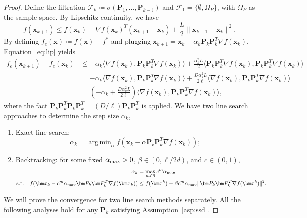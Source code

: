 \documentclass[10pt]{article} %
\numberwithin{equation}{section}
\theoremstyle{plain}
\theoremstyle{definition}
\newcommand{\<}{\langle}
\renewcommand{\>}{\rangle}
\renewcommand{\(}{\left(}
\renewcommand{\)}{\right)}
\renewcommand{\[}{\left[}
\renewcommand{\]}{\right]}
\DeclareMathOperator*{\argmin}{arg\,min}
\newcommand{\alphaMax}{\alpha_\textup{max}}
\newcommand{\Lip}{L}
\begin{document}
\begin{proof}
Define the filtration $\mathcal{F}_k\coloneqq \sigma(\bm P_1,\dots,\bm P_{k-1})$ and $\mathcal{F}_1=\{\emptyset, \Omega_P\}$, with $\Omega_P$ as the sample space. By Lipschitz continuity, we have
\begin{equation}
\label{eq:lip}
    f(\bm x_{k+1})\leq f(\bm x_k) + \nabla f(\bm x_k)^T(\bm x_{k+1} - \bm x_k) + \frac{\Lip}{2}\lVert\bm x_{k+1} - \bm x_k\rVert^2.
\end{equation}
By defining $f_e(\bm x) \coloneqq f(\bm x) - f^*$ and plugging $\bm x_{k+1} = \bm x_k - \alpha_k\bm P_k\bm P_k^T\nabla f(\bm x_k)$, Equation~\eqref{eq:lip} yields
\begin{equation}
\label{eqn:quad-form}
\begin{aligned}
f_e(\bm x_{k+1}) - f_e(\bm x_k) 
&\leq -\alpha_k\langle \nabla f(\bm x_k), \bm P_k\bm P_k^T\nabla f(\bm x_k)\rangle + \frac{\alpha_k^2\Lip}{2}\langle \bm P_k\bm P_k^T\nabla f(\bm x_k), \bm P_k\bm P_k^T\nabla f(\bm x_k)\rangle \\
&= -\alpha_k\langle \nabla f(\bm x_k), \bm P_k\bm P_k^T\nabla f(\bm x_k)\rangle + \frac{D\alpha_k^2\Lip}{2\ell}\langle \nabla f(\bm x_k), \bm P_k\bm P_k^T\nabla f(\bm x_k)\rangle \\
&= \left(-\alpha_k+\frac{D\alpha_k^2\Lip}{2\ell}\right)\langle \nabla f(\bm x_k), \bm P_k\bm P_k^T\nabla f(\bm x_k)\rangle,
\end{aligned}
\end{equation}
where the fact $\bm P_k\bm P_k^T\bm P_k\bm P_k^T = (D/\ell)\bm P_k\bm P_k^T$ is applied. We have two line search approaches to determine the step size $\alpha_k$,
\begin{enumerate}
    \item Exact line search: 
    \begin{equation}
    \label{eq:exact-line-sear}
    \alpha_k = \argmin_\alpha f(\bm x_k - \alpha\bm P_k\bm P_k^T\nabla f(\bm x_k));
    \end{equation}
    \item Backtracking: for some fixed $\alphaMax>0$, $\beta\in(0,\ell/2d)$, and $c\in(0,1)$, 
    \begin{equation}
    \label{eq:backtracking}
    \begin{aligned}
    \alpha_k &= \max_{m\in\mathbb{N}} c^m\alphaMax\\
    \text{s.t.}\quad
    f(\bm x_k - c^m\alphaMax\bm P_k\bm P_k^T\nabla f(\bm x_k))&\leq f(\bm x^k) - \beta c^m \alphaMax\lVert \bm P_k\bm P_k^T\nabla f(\bm x^k)\rVert^2.
    \end{aligned}
    \end{equation}
\end{enumerate}
We will prove the convergence for two line search methods separately. All the following analyses hold for any $\bm P_k$ satisfying Assumption~\ref{asp:ssd}.


\end{proof}
\end{document}
